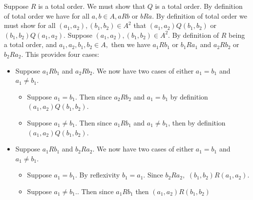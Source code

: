 \documentclass[12pt, letterpaper]{article}
\begin{document}
\begin{enumerate}
Suppose $R$ is a total order.  We must show that $Q$ is a total order.  By definition of total order we have for all $a,b \in A, aRb$ or $bRa.$  By definition of total order we must show for all $(a_1,a_2),(b_1,b_2) \in A^2$ that $(a_1,a_2)Q(b_1,b_2)$ or $(b_1,b_2)Q(a_1,a_2)$.  Suppose $(a_1,a_2),(b_1,b_2)\in A^2.$  By definition of $R$ being a total order, and $a_1,a_2,b_1,b_2 \in A,$ then we have $a_1 R b_1$ or $b_1 R a_1$ and $a_2 R b_2$ or $b_2 R a_2.$  This provides four cases:
\begin{itemize}
	\item Suppose $a_1 R b_1$ and $a_2 R b_2$.  We now have two cases of either $a_1 = b_1$ and $a_1 \neq b_1$.  \begin{itemize}
		\item Suppose $a_1 = b_1$.  Then since $a_2 R b_2$ and $a_1 = b_1$ by definition $(a_1,a_2)Q(b_1,b_2)$.
		\item Suppose $a_1 \neq b_1$.  Then since $a_1 R b_1$ and $a_1 \neq b_1$, then by definition  $(a_1,a_2)Q(b_1,b_2)$.
	\end{itemize}
	\item Suppose $a_1 R b_1$ and  $b_2 R a_2.$ We now have two cases of either $a_1 = b_1$ and $a_1 \neq b_1$. 
	\begin{itemize}
		\item Suppose  $a_1 = b_1.$  By reflexivity $b_1 = a_1.$ Since $b_2 R a_2,$  $(b_1,b_2)R(a_1,a_2)$.
		\item Suppose $a_1 \neq b_1.$.  Then since $a_1 R b_1$ then $(a_1,a_2) R (b_1,b_2)$
			\end{itemize}
\end{itemize}
\end{enumerate}
\end{document}
